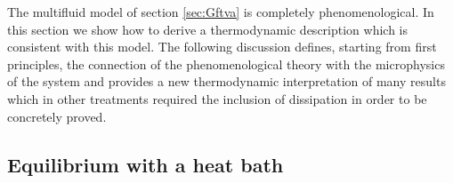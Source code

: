 \documentclass[usenatbib]{mnras}
\begin{document}
The multifluid model of section \ref{sec:Gftva} is completely phenomenological. 
%
In this section we show how to derive a thermodynamic description which is consistent with this model.
The following discussion defines, starting from first principles, the connection of the phenomenological theory with the microphysics of the system and provides a new thermodynamic interpretation of many results which in other treatments required the inclusion of dissipation in order to be concretely proved.

\subsection{Equilibrium with a heat bath}
\label{EwHb}
\end{document}

